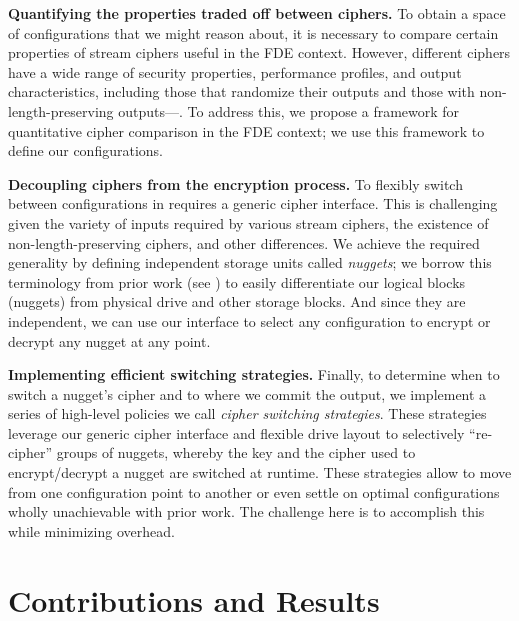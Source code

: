 \textbf{Quantifying the properties traded off between ciphers.} To
obtain a space of configurations that we might reason about, it is
necessary to compare certain properties of stream ciphers useful in
the FDE context. However, different ciphers have a wide range of
security properties, performance profiles, and output characteristics,
including those that randomize their outputs and those with
non-length-preserving outputs---. To address this, we propose a framework for
quantitative cipher comparison in the FDE context; we use this
framework to define our configurations.

\textbf{Decoupling ciphers from the encryption process.} To flexibly switch
between configurations in \sys requires a generic cipher interface. This
is challenging given the variety of inputs required by various stream ciphers,
the existence of non-length-preserving ciphers, and other differences. We
achieve the required generality by defining independent storage units called
\emph{nuggets}; we borrow this terminology from prior work (see
\cite{StrongBox}) to easily differentiate our logical blocks (nuggets) from
physical drive and other storage blocks. And since they are independent, we can
use our interface to select any configuration to encrypt or decrypt any nugget
at any point.

\textbf{Implementing efficient switching strategies.} Finally, to determine when
to switch a nugget's cipher and to where we commit the output, we implement a
series of high-level policies we call \textit{cipher switching strategies}.
These strategies leverage our generic cipher interface and flexible drive layout
to selectively ``re-cipher'' groups of nuggets, whereby the key and the cipher
used to encrypt/decrypt a nugget are switched at runtime. These strategies allow
\sys to move from one configuration point to another or even settle on
optimal configurations wholly unachievable with prior work. The challenge here
is to accomplish this while minimizing overhead.

\section{Contributions and Results}
\label{sec:key-contributions}

